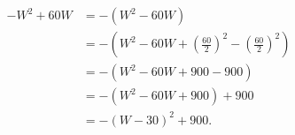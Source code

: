 \documentclass[16pt]{extarticle} %
\begin{document}
\begin{align*} 
-W^2 + 60W &= -(W^2 - 60W) \\
&= - \left( W^2 - 60W + \left(\frac{60}{2} \right)^2 - \left(\frac{60}{2} \right)^2 \right) \\
&= -(W^2 - 60W + 900 - 900) \\
&= -(W^2 - 60W + 900) + 900 \\
&= -(W - 30)^2 + 900.
\end{align*}
\end{document}
